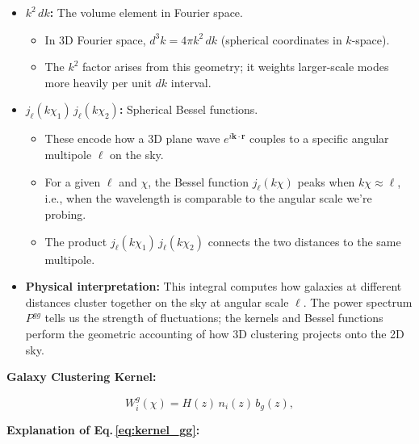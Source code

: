 \begin{itemize}[leftmargin=1.5cm]
    \item \textbf{$k^2 \, dk$:} The volume element in Fourier space.
    \begin{itemize}
        \item In 3D Fourier space, $d^3 k = 4\pi k^2 \, dk$ (spherical coordinates in $k$-space).
        \item The $k^2$ factor arises from this geometry; it weights larger-scale modes more heavily per unit $dk$ interval.
    \end{itemize}

    \item \textbf{$j_\ell(k\chi_1) \, j_\ell(k\chi_2)$:} Spherical Bessel functions.
    \begin{itemize}
        \item These encode how a 3D plane wave $e^{i\mathbf{k} \cdot \mathbf{r}}$ couples to a specific angular multipole $\ell$ on the sky.
        \item For a given $\ell$ and $\chi$, the Bessel function $j_\ell(k\chi)$ peaks when $k \chi \approx \ell$, i.e., when the wavelength is comparable to the angular scale we're probing.
        \item The product $j_\ell(k\chi_1) \, j_\ell(k\chi_2)$ connects the two distances to the same multipole.
    \end{itemize}

    \item \textbf{Physical interpretation:} This integral computes how galaxies at different distances cluster together on the sky at angular scale $\ell$. The power spectrum $P^{gg}$ tells us the strength of fluctuations; the kernels and Bessel functions perform the geometric accounting of how 3D clustering projects onto the 2D sky.
\end{itemize}

\noindent\textbf{\large Galaxy Clustering Kernel:}

\begin{equation}
    W^g_i(\chi) = H(z)\,n_i(z)\,b_g(z),
    \label{eq:kernel_gg}
\end{equation}

\noindent\textbf{\large Explanation of Eq.\,\eqref{eq:kernel_gg}:}\\

